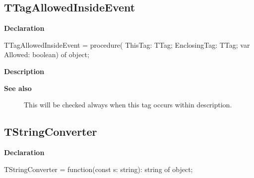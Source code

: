 \documentclass{report}
\newif\ifpdf
\begin{document}
\subsection*{TTagAllowedInsideEvent}
\fi
\label{PasDoc_TagManager-TTagAllowedInsideEvent}
\begin{list}{}{
\setlength{\itemindent}{0cm}
\setlength{\listparindent}{0cm}
\setlength{\leftmargin}{\evensidemargin}
\addtolength{\leftmargin}{\tmplength}
\settowidth{\labelsep}{X}
\addtolength{\leftmargin}{\labelsep}
\setlength{\labelwidth}{\tmplength}
}
\item[\textbf{Declaration}\hfill]
\ifpdf
\begin{flushleft}
\fi
\begin{ttfamily}
TTagAllowedInsideEvent = procedure( ThisTag: TTag; EnclosingTag: TTag; var Allowed: boolean) of object;\end{ttfamily}

\ifpdf
\end{flushleft}
\fi

\par
\item[\textbf{Description}]
 \item[\textbf{See also}]
\begin{description}
\item[\begin{ttfamily}TTag.AllowedInside\end{ttfamily}(\ref{PasDoc_TagManager.TTag-AllowedInside})] 
This will be checked always when this tag occurs within description.
\end{description}


\end{list}
\ifpdf
\subsection*{\large{\textbf{TStringConverter}}\normalsize\hspace{1ex}\hrulefill}
\else
\subsection*{TStringConverter}
\fi
\label{PasDoc_TagManager-TStringConverter}
\begin{list}{}{
\setlength{\itemindent}{0cm}
\setlength{\listparindent}{0cm}
\setlength{\leftmargin}{\evensidemargin}
\addtolength{\leftmargin}{\tmplength}
\settowidth{\labelsep}{X}
\addtolength{\leftmargin}{\labelsep}
\setlength{\labelwidth}{\tmplength}
}
\item[\textbf{Declaration}\hfill]
\ifpdf
\begin{flushleft}
\fi
\begin{ttfamily}
TStringConverter = function(const s: string): string of object;\end{ttfamily}

\ifpdf
\end{flushleft}
\fi

\end{list}
\ifpdf
\end{document}
